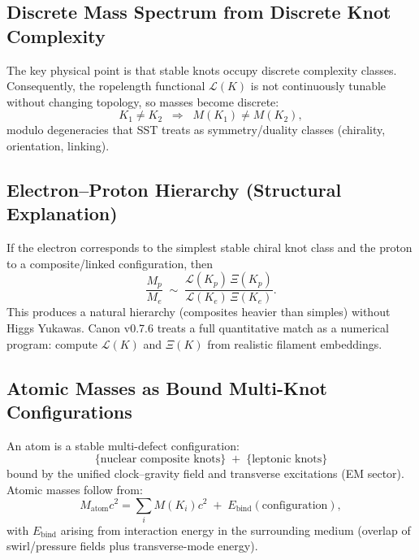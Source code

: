 \documentclass[10pt]{article}
\begin{document}
    \subsection{Discrete Mass Spectrum from Discrete Knot Complexity}

        The key physical point is that stable knots occupy discrete complexity classes.
        Consequently, the ropelength functional $\mathcal{L}(K)$ is not continuously tunable
        without changing topology, so masses become discrete:
        \begin{equation}
            K_1\neq K_2 \;\;\Rightarrow\;\; M(K_1)\neq M(K_2),
        \end{equation}
        modulo degeneracies that SST treats as symmetry/duality classes (chirality,
        orientation, linking).

    \subsection{Electron--Proton Hierarchy (Structural Explanation)}

        If the electron corresponds to the simplest stable chiral knot class and the proton
        to a composite/linked configuration, then
        \begin{equation}
            \frac{M_p}{M_e}\;\sim\;\frac{\mathcal{L}(K_p)\,\Xi(K_p)}{\mathcal{L}(K_e)\,\Xi(K_e)}.
        \end{equation}
        This produces a natural hierarchy (composites heavier than simples) without Higgs
        Yukawas. Canon v0.7.6 treats a full quantitative match as a numerical program:
        compute $\mathcal{L}(K)$ and $\Xi(K)$ from realistic filament embeddings.

    \subsection{Atomic Masses as Bound Multi-Knot Configurations}

        An atom is a stable multi-defect configuration:
        \[
            \{\text{nuclear composite knots}\} \;+\; \{\text{leptonic knots}\}
        \]
        bound by the unified clock--gravity field and transverse excitations (EM sector).
        Atomic masses follow from:
        \begin{equation}
            M_{\text{atom}}c^2
            =
            \sum_i M(K_i)c^2
            \;+\;E_{\text{bind}}(\text{configuration}),
        \end{equation}
        with $E_{\text{bind}}$ arising from interaction energy in the surrounding medium
        (overlap of swirl/pressure fields plus transverse-mode energy).
\end{document}
